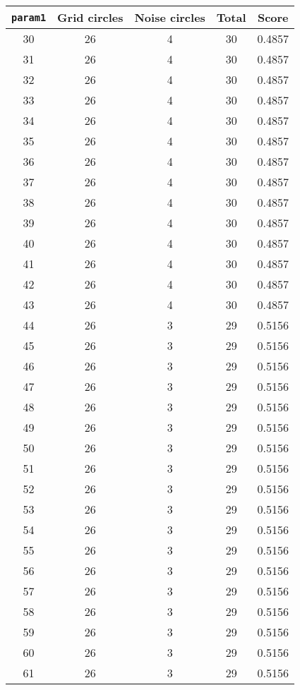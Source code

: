 \documentclass[letterpaper, 12pt]{article}
\begin{document}
\begin{longtable}{|c|c|c|c|c|}
\hline
\textbf{\texttt{param1}} & \textbf{Grid circles} & \textbf{Noise circles} & \textbf{Total} & \textbf{Score} \\
\hline
30 & 26 & 4 & 30 & 0.4857 \\
\hline
31 & 26 & 4 & 30 & 0.4857 \\
\hline
32 & 26 & 4 & 30 & 0.4857 \\
\hline
33 & 26 & 4 & 30 & 0.4857 \\
\hline
34 & 26 & 4 & 30 & 0.4857 \\
\hline
35 & 26 & 4 & 30 & 0.4857 \\
\hline
36 & 26 & 4 & 30 & 0.4857 \\
\hline
37 & 26 & 4 & 30 & 0.4857 \\
\hline
38 & 26 & 4 & 30 & 0.4857 \\
\hline
39 & 26 & 4 & 30 & 0.4857 \\
\hline
40 & 26 & 4 & 30 & 0.4857 \\
\hline
41 & 26 & 4 & 30 & 0.4857 \\
\hline
42 & 26 & 4 & 30 & 0.4857 \\
\hline
43 & 26 & 4 & 30 & 0.4857 \\
\hline
44 & 26 & 3 & 29 & 0.5156 \\
\hline
45 & 26 & 3 & 29 & 0.5156 \\
\hline
46 & 26 & 3 & 29 & 0.5156 \\
\hline
47 & 26 & 3 & 29 & 0.5156 \\
\hline
48 & 26 & 3 & 29 & 0.5156 \\
\hline
49 & 26 & 3 & 29 & 0.5156 \\
\hline
50 & 26 & 3 & 29 & 0.5156 \\
\hline
51 & 26 & 3 & 29 & 0.5156 \\
\hline
52 & 26 & 3 & 29 & 0.5156 \\
\hline
53 & 26 & 3 & 29 & 0.5156 \\
\hline
54 & 26 & 3 & 29 & 0.5156 \\
\hline
55 & 26 & 3 & 29 & 0.5156 \\
\hline
56 & 26 & 3 & 29 & 0.5156 \\
\hline
57 & 26 & 3 & 29 & 0.5156 \\
\hline
58 & 26 & 3 & 29 & 0.5156 \\
\hline
59 & 26 & 3 & 29 & 0.5156 \\
\hline
60 & 26 & 3 & 29 & 0.5156 \\
\hline
61 & 26 & 3 & 29 & 0.5156 \\

\end{longtable}
\end{document}
